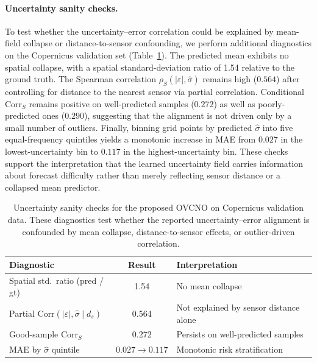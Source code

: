 \documentclass[11pt,a4paper]{article}
\begin{document}
\paragraph{Uncertainty sanity checks.}
To test whether the uncertainty--error correlation could be explained by mean-field collapse or distance-to-sensor confounding, we perform additional diagnostics on the Copernicus validation set (Table~\ref{tab:uncertainty_sanity}). The predicted mean exhibits no spatial collapse, with a spatial standard-deviation ratio of 1.54 relative to the ground truth. The Spearman correlation $\rho_S(|\varepsilon|,\hat{\sigma})$ remains high ($0.564$) after controlling for distance to the nearest sensor via partial correlation. Conditional Corr$_S$ remains positive on well-predicted samples ($0.272$) as well as poorly-predicted ones ($0.290$), suggesting that the alignment is not driven only by a small number of outliers. Finally, binning grid points by predicted $\hat{\sigma}$ into five equal-frequency quintiles yields a monotonic increase in MAE from $0.027$ in the lowest-uncertainty bin to $0.117$ in the highest-uncertainty bin. These checks support the interpretation that the learned uncertainty field carries information about forecast difficulty rather than merely reflecting sensor distance or a collapsed mean predictor.

\begin{table}[!htbp]
\centering
\caption{Uncertainty sanity checks for the proposed OVCNO on Copernicus validation data. These diagnostics test whether the reported uncertainty--error alignment is confounded by mean collapse, distance-to-sensor effects, or outlier-driven correlation.}
\label{tab:uncertainty_sanity}
\vspace{4pt}
\small
\begin{tabular}{@{}l c l@{}}
\toprule
\textbf{Diagnostic} & \textbf{Result} & \textbf{Interpretation} \\
\midrule
Spatial std.~ratio (pred / gt) & 1.54 & No mean collapse \\
Partial Corr$(|\varepsilon|,\hat{\sigma} \mid d_s)$ & 0.564 & Not explained by sensor distance alone \\
Good-sample Corr$_S$ & 0.272 & Persists on well-predicted samples \\
MAE by $\hat{\sigma}$ quintile & $0.027 \to 0.117$ & Monotonic risk stratification \\
\bottomrule
\end{tabular}
\end{table}
\end{document}
